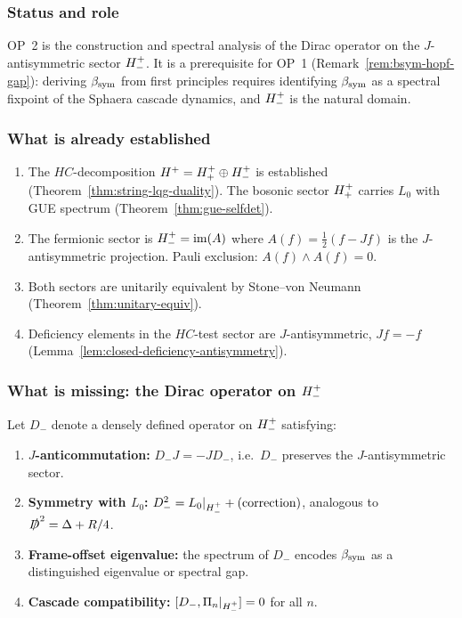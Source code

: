 \subsubsection{Status and role}

OP~2 is the construction and spectral analysis of the Dirac operator on
the $J$-antisymmetric sector $H^+_-$. It is a prerequisite for
OP~1 (Remark~\ref{rem:bsym-hopf-gap}): deriving $\beta_{\mathrm{sym}}$ from first
principles requires identifying $\beta_{\mathrm{sym}}$ as a spectral fixpoint of the
Sphaera cascade dynamics, and $H^+_-$ is the natural domain.

\subsubsection{What is already established}

\begin{enumerate}[label=(\arabic*)]
 \item The $HC$-decomposition $H^+ = H^+_+\oplus H^+_-$
 is established (Theorem~\ref{thm:string-lqg-duality}).
 The bosonic sector $H^+_+$ carries $L_0$ with GUE spectrum
 (Theorem~\ref{thm:gue-selfdet}).
 \item The fermionic sector is $H^+_- = \mathrm{im}(A)$ where
 $A(f)=\tfrac{1}{2}(f-Jf)$ is the $J$-antisymmetric projection.
 Pauli exclusion: $A(f)\wedge A(f)=0$.
 \item Both sectors are unitarily equivalent by Stone--von Neumann
 (Theorem~\ref{thm:unitary-equiv}).
 \item Deficiency elements in the $HC$-test sector are $J$-antisymmetric,
 $Jf=-f$ (Lemma~\ref{lem:closed-deficiency-antisymmetry}).
\end{enumerate}

\subsubsection{What is missing: the Dirac operator on $H^+_-$}

\begin{definition}
\label{def:dirac-op-Hplusminus}
Let $D_{-}$ denote a densely defined operator on $H^+_-$ satisfying:
\begin{enumerate}[label=(D\arabic*)]
 \item \textbf{$J$-anticommutation:} $D_{-}J=-JD_{-}$, i.e.\ $D_{-}$
 preserves the $J$-antisymmetric sector.
 \item \textbf{Symmetry with $L_0$:} $D_{-}^2 =
 L_0|_{H^+_-} + (\text{correction})$, analogous to
 $\slashed{D}^2 = \Delta + R/4$.
 \item \textbf{Frame-offset eigenvalue:} the spectrum of $D_{-}$
 encodes $\beta_{\mathrm{sym}}$ as a distinguished eigenvalue or spectral gap.
 \item \textbf{Cascade compatibility:}
 $[D_{-},\Pi_n|_{H^+_-}]=0$ for all $n$.
\end{enumerate}
\end{definition}

